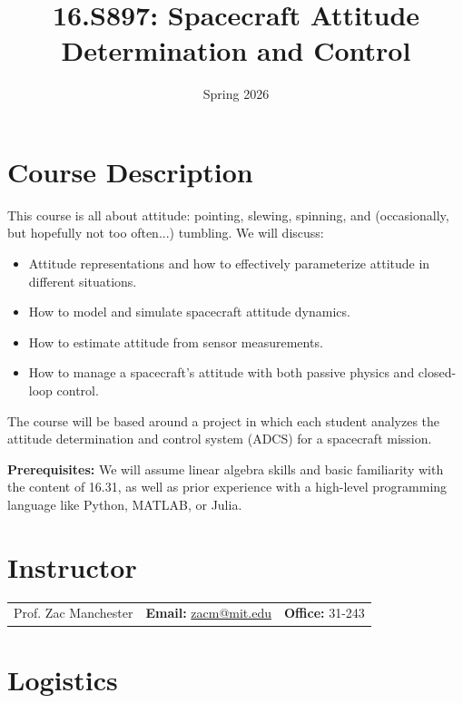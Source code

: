 \documentclass[11pt,letterpaper]{article}
\title{16.S897: Spacecraft Attitude Determination and Control}
\author{Spring 2026}
\date{}
\begin{document}
\maketitle


\section*{Course Description}

This course is all about attitude: pointing, slewing, spinning, and (occasionally, but hopefully not too often...) tumbling. We will discuss:
\begin{itemize}
\item Attitude representations and how to effectively parameterize attitude in different situations.
\item How to model and simulate spacecraft attitude dynamics.
\item How to estimate attitude from sensor measurements.
\item How to manage a spacecraft's attitude with both passive physics and closed-loop control.
\end{itemize}
The course will be based around a project in which each student analyzes the attitude determination and control system (ADCS) for a spacecraft mission.

\medskip
\noindent
\textbf{Prerequisites:} We will assume linear algebra skills and basic familiarity with the content of 16.31, as well as prior experience with a high-level programming language like Python, MATLAB, or Julia.

\section*{Instructor}

\begin{center}
\begin{tabular}{l l l}
	Prof. Zac Manchester & \textbf{Email:} \href{mailto:zacm@mit.edu}{zacm@mit.edu} & \textbf{Office:} 31-243
\end{tabular}
\end{center}

\section*{Logistics}
\end{document}
